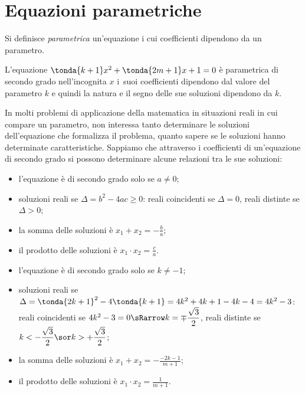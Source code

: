 \section{Equazioni parametriche}
\label{sec:eq2gr_parametriche}

\begin{definizione}
Si definisce \emph{parametrica} un'equazione i cui coefficienti dipendono da un 
parametro.
\end{definizione}
L'equazione $\tonda{k +1}x^{2} + \tonda{2m +1}x + 1 = 0$ è 
parametrica di secondo 
grado nell'incognita $x$ i~suoi coefficienti dipendono dal valore del parametro 
$k$ e quindi la natura e il segno delle sue soluzioni dipendono da $k$.

In molti problemi di applicazione della matematica in situazioni reali in cui 
compare un parametro, non interessa tanto determinare le soluzioni 
dell'equazione che formalizza il problema, quanto sapere se le soluzioni hanno 
determinate caratteristiche.
Sappiamo che attraverso i coefficienti di un'equazione di secondo grado si 
possono determinare alcune relazioni tra le sue soluzioni:
\begin{itemize} [noitemsep]
\item l'equazione è di secondo grado solo se \(a \neq 0\);
\item soluzioni reali se $\Delta = b^{2} - 4 a c \geq 0$:
 \subitem reali coincidenti se $\Delta = 0$, 
 \subitem reali distinte se $\Delta > 0$;
\item la somma delle soluzioni è $x_{1} + x_{2} = - \frac{b}{a}$;
\item il prodotto delle soluzioni è $x_{1} \cdot x_{2} = \frac{c}{a}$.
\end{itemize}

\begin{itemize} [noitemsep]
\item l'equazione è di secondo grado solo se \(k \neq -1\);
\item soluzioni reali se 
$\Delta = \tonda{2k +1}^{2} - 4 \tonda{k +1}= 4k^2 +4k +1-4k-4= 4k^2-3$:
 \subitem reali coincidenti se 
 $4k^2-3 = 0 \sRarrow k = \mp \dfrac{\sqrt{3}}{2}$, 
 \subitem reali distinte se 
 $k < -\dfrac{\sqrt{3}}{2} \sor k > +\dfrac{\sqrt{3}}{2}$;
\item la somma delle soluzioni è 
$x_{1} + x_{2} = - \frac{-2k -1}{m+1}$;
\item il prodotto delle soluzioni è 
$x_{1} \cdot x_{2} = \frac{1}{m+1}$.
\end{itemize}

